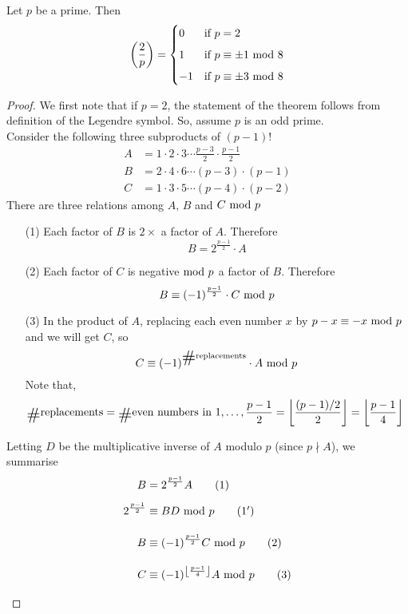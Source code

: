 \begin{theorem}
Let $p$ be a prime. Then
\[\bigg(\dfrac{2}{p}\bigg) = \begin{cases}0 & \text{if $p = 2$}\\[0.5em] 1 & \text{if $p\equiv \pm 1 \text{ mod }{8}$}\\[0.5em] -1 & \text{if $p\equiv \pm 3\text{ mod }{8}$} \end{cases}\]
\end{theorem}
\begin{proof}
We first note that if $p = 2$, the statement of the theorem follows from definition of the Legendre symbol. So, assume $p$ is an odd prime.\\[0.5em]
Consider the following three subproducts of $(p-1)!$
\begin{align*}
A &= 1\cdot 2\cdot 3\cdots \frac{p-3}{2}\cdot \frac{p-1}{2}\\[0.5em]
B &= 2\cdot 4\cdot 6\cdots (p-3)\cdot (p-1)\\[0.5em]
C &= 1\cdot 3\cdot 5\cdots (p-4)\cdot (p-2)
\end{align*}
There are three relations among $A,\,B$ and $C \text{ mod }{p}$
\begin{itemize}
\item[(1)] Each factor of $B$ is $2\times$ a factor of $A$. Therefore
\[B = 2^{\frac{p-1}{2}}\cdot A\]
\item[(2)] Each factor of $C$ is negative$\text{ mod }{p}$ a factor of $B$. Therefore
\[B \equiv (-1)^{\frac{p-1}{2}}\cdot C\text{ mod }{p}\]
\item[(3)] In the product of $A$, replacing each even number $x$ by $p - x \equiv -x \text{ mod }{p}$ and we will get $C$, so
\[C \equiv (-1)^{\card\text{replacements}}\cdot A\modar{p}\]
Note that,
\begin{align*}
\card\text{replacements} = \card\text{even numbers in } 1,\ldots,\frac{p-1}{2} &= \left\lfloor \frac{(p-1)/2}{2}\right\rfloor = \left\lfloor \frac{p-1}{4}\right\rfloor
\end{align*}
\end{itemize}
Letting $D$ be the multiplicative inverse of $A$ modulo $p$ (since $p\nmid A$), we summarise
\begin{align*}
B &= 2^{\frac{p-1}{2}} A \label{qr21}\tag{$1$}\\[0.5em]
2^{\frac{p-1}{2}} &\equiv BD \modar{p} \label{qr211}\tag{$1'$}\\[1em]
B&\equiv (-1)^{\frac{p-1}{2}} C\modar{p} \label{qr22}\tag{$2$}\\[1em]
C &\equiv (-1)^{\left\lfloor \frac{p-1}{4}\right\rfloor} A\modar{p} \label{qr23}\tag{$3$}\\[0.5em]

\end{align*}
\end{proof}
